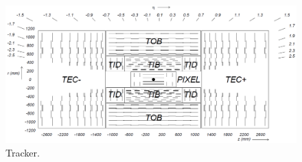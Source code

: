 \begin{figure}[!htb]
  \centering
    \includegraphics[width=.9\textwidth]{figures/cmstracker.png}
  \caption{Tracker.}
  \label{fig:CMS_tracker}
\end{figure}

